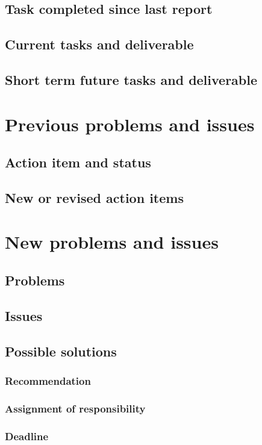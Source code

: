 \documentclass[a4paper, 12pt, onepage]{article}
\begin{document}
      \subsection{Task completed since last report}
      \subsection{Current tasks and deliverable}
      \subsection{Short term future tasks and deliverable}

      \cleardoublepage
      \section{Previous problems and issues}
      \subsection{Action item and status} %
      \subsection{New or revised action items} %

      \cleardoublepage
      \section{New problems and issues}
      \subsection{Problems}
      \subsection{Issues}
      \subsection{Possible solutions}
      \subsubsection{Recommendation}
      \subsubsection{Assignment of responsibility}
      \subsubsection{Deadline}
\end{document}
